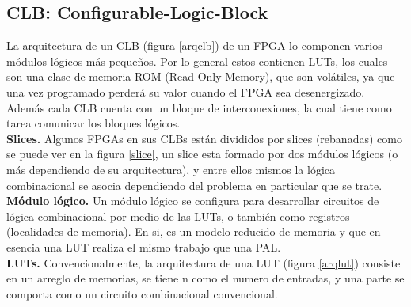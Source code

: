 \documentclass[twoside,spanish,ESP,MSc]{plantillaLabUPV}
\theoremstyle{definition}
\newcommand{\f}{FPGA }
\newcommand{\fs}{FPGAs }
\begin{document}
\subsection*{CLB: Configurable-Logic-Block}

La arquitectura de un CLB (figura \ref{arqclb}) de un \f lo componen varios módulos lógicos más pequeños. Por lo general estos contienen LUTs, los cuales son una clase de memoria ROM (Read-Only-Memory), que son volátiles, ya que una vez programado perderá su valor cuando el \f sea desenergizado. Además cada CLB cuenta con un bloque de interconexiones, la cual tiene como tarea comunicar los bloques lógicos.\\



\checkmark\textbf{Slices.} Algunos \fs en sus CLBs están divididos por slices (rebanadas) como se puede ver en la figura \ref{slice}, un slice esta formado por dos módulos lógicos (o más dependiendo de su arquitectura), y entre ellos mismos la lógica combinacional se asocia dependiendo del problema en particular que se trate.\\



\checkmark\textbf{Módulo lógico.} Un módulo lógico se configura para desarrollar circuitos de lógica combinacional por medio de las LUTs, o también como registros (localidades de memoria). En si, es un modelo reducido de memoria  y que en esencia una LUT realiza el mismo trabajo que una PAL.\\


\checkmark\textbf{LUTs.} Convencionalmente, la arquitectura de una LUT (figura \ref{arqlut}) consiste en un arreglo de memorias, se tiene n como el numero de entradas, y una parte se comporta como un circuito combinacional convencional.\\
\end{document}
